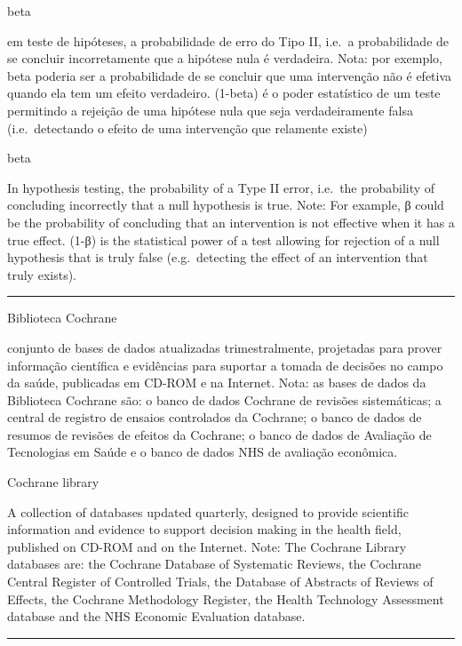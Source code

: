 \documentclass[
  openany]{book}
\begin{document}
beta

em teste de hipóteses, a probabilidade de erro do Tipo II, i.e.~a probabilidade de se concluir incorretamente que a hipótese nula é verdadeira. Nota: por exemplo, beta poderia ser a probabilidade de se concluir que uma intervenção não é efetiva quando ela tem um efeito verdadeiro. (1-beta) é o poder estatístico de um teste permitindo a rejeição de uma hipótese nula que seja verdadeiramente falsa (i.e.~detectando o efeito de uma intervenção que relamente existe)

beta

In hypothesis testing, the probability of a Type II error, i.e.~the probability of concluding incorrectly that a null hypothesis is true. Note: For example, β could be the probability of concluding that an intervention is not effective when it has a true effect. (1-β) is the statistical power of a test allowing for rejection of a null hypothesis that is truly false (e.g.~detecting the effect of an intervention that truly exists).

\begin{center}\rule{0.5\linewidth}{0.5pt}\end{center}

Biblioteca Cochrane

conjunto de bases de dados atualizadas trimestralmente, projetadas para prover informação científica e evidências para suportar a tomada de decisões no campo da saúde, publicadas em CD-ROM e na Internet. Nota: as bases de dados da Biblioteca Cochrane são: o banco de dados Cochrane de revisões sistemáticas; a central de registro de ensaios controlados da Cochrane; o banco de dados de resumos de revisões de efeitos da Cochrane; o banco de dados de Avaliação de Tecnologias em Saúde e o banco de dados NHS de avaliação econômica.

Cochrane library

A collection of databases updated quarterly, designed to provide scientific information and evidence to support decision making in the health field, published on CD-ROM and on the Internet. Note: The Cochrane Library databases are: the Cochrane Database of Systematic Reviews, the Cochrane Central Register of Controlled Trials, the Database of Abstracts of Reviews of Effects, the Cochrane Methodology Register, the Health Technology Assessment database and the NHS Economic Evaluation database.

\begin{center}\rule{0.5\linewidth}{0.5pt}\end{center}
\end{document}
